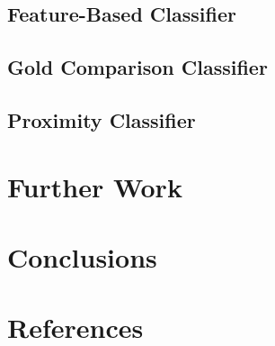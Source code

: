 \documentclass[preprint,3p,12pt]{elsarticle}
\begin{document}
\subsection{Feature-Based Classifier}
\label{results:featurebased}
\lipsum[1-2]

\subsection{Gold Comparison Classifier}
\label{results:gold}
\lipsum[1-1]

\subsection{Proximity Classifier}
\label{results:proximity}
\lipsum[1-3]

\section{Further Work}
\label{further work}
\lipsum[1-3]

\section{Conclusions}
\label{conclusions}
\lipsum[1-3]

\section{References}
\label{references}





%
%






\end{document}
